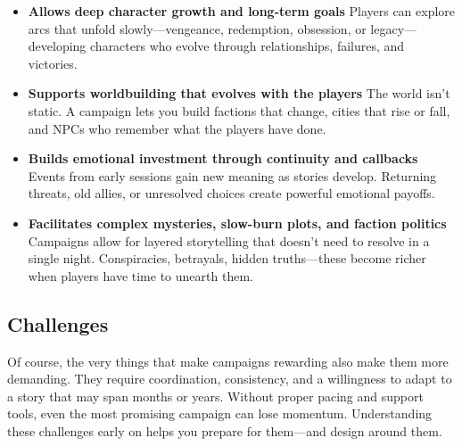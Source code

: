\begin{itemize}
    \item \textbf{Allows deep character growth and long-term goals}  
    Players can explore arcs that unfold slowly—vengeance, redemption, obsession, or legacy—developing characters who evolve through relationships, failures, and victories.

    \item \textbf{Supports worldbuilding that evolves with the players}  
    The world isn’t static. A campaign lets you build factions that change, cities that rise or fall, and NPCs who remember what the players have done.

    \item \textbf{Builds emotional investment through continuity and callbacks}  
    Events from early sessions gain new meaning as stories develop. Returning threats, old allies, or unresolved choices create powerful emotional payoffs.

    \item \textbf{Facilitates complex mysteries, slow-burn plots, and faction politics}  
    Campaigns allow for layered storytelling that doesn’t need to resolve in a single night. Conspiracies, betrayals, hidden truths—these become richer when players have time to unearth them.
\end{itemize}

\subsection*{Challenges}

Of course, the very things that make campaigns rewarding also make them more demanding. They require coordination, consistency, and a willingness to adapt to a story that may span months or years. Without proper pacing and support tools, even the most promising campaign can lose momentum. Understanding these challenges early on helps you prepare for them—and design around them.

